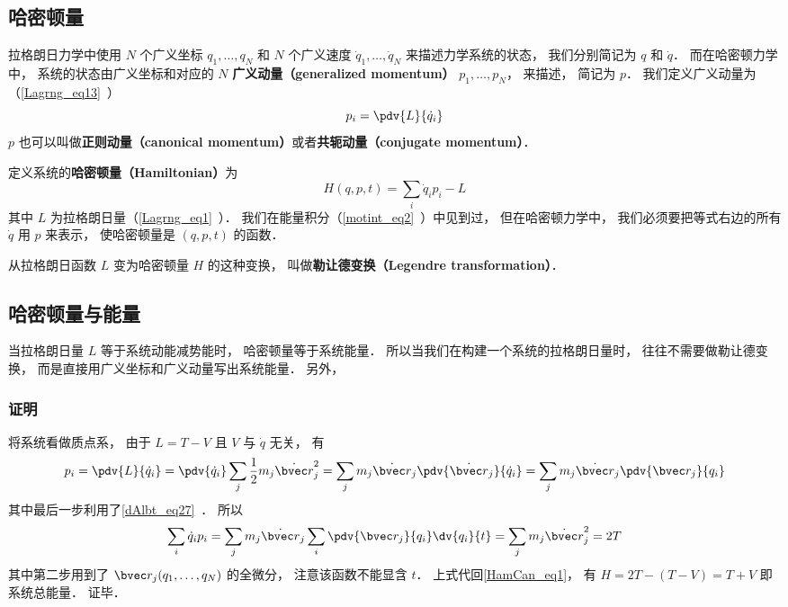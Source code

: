 

\subsection{哈密顿量}
拉格朗日力学中使用 $N$ 个广义坐标 $q_1,\dots,q_N$ 和 $N$ 个广义速度 $\dot q_1,\dots,\dot q_N$ 来描述力学系统的状态， 我们分别简记为 $q$ 和 $\dot q$． 而在哈密顿力学中， 系统的状态由广义坐标和对应的 $N$ \textbf{广义动量（generalized momentum）} $p_1, \dots, p_N$， 来描述， 简记为 $p$． 我们定义广义动量为（\autoref{Lagrng_eq13}~）
\begin{equation}
p_i = \pdv{L}{\dot q_i}
\end{equation}
$p$ 也可以叫做\textbf{正则动量（canonical momentum）}或者\textbf{共轭动量（conjugate momentum）}．

定义系统的\textbf{哈密顿量（Hamiltonian）}为
\begin{equation}\label{HamCan_eq1}
H(q,p,t) = \sum_i \dot q_i p_i - L
\end{equation}
其中 $L$ 为拉格朗日量（\autoref{Lagrng_eq1}~）． 我们在能量积分（\autoref{motint_eq2}~）中见到过， 但在哈密顿力学中， 我们必须要把等式右边的所有 $\dot q$ 用 $p$ 来表示， 使哈密顿量是 $(q,p,t)$ 的函数．

从拉格朗日函数 $L$ 变为哈密顿量 $H$ 的这种变换， 叫做\textbf{勒让德变换（Legendre transformation）}．

\subsection{哈密顿量与能量}
当拉格朗日量 $L$ 等于系统动能减势能时， 哈密顿量等于系统能量． 所以当我们在构建一个系统的拉格朗日量时， 往往不需要做勒让德变换， 而是直接用广义坐标和广义动量写出系统能量． 另外， 

\subsubsection{证明}
将系统看做质点系， 由于 $L = T - V$ 且 $V$ 与 $\dot q$ 无关， 有
\begin{equation}
p_i = \pdv{L}{\dot q_i} = \pdv{\dot q_i} \sum_j \frac12 m_j \dot{\bvec r}_j^2
= \sum_j m_j \dot{\bvec r}_j \pdv{\dot{\bvec r}_j}{\dot q_i}
= \sum_j m_j \dot{\bvec r}_j  \pdv{\bvec r_j}{q_i}
\end{equation}
其中最后一步利用了\autoref{dAlbt_eq27}~． 所以
\begin{equation}
 \sum_i \dot q_i p_i = \sum_j m_j \dot{\bvec r}_j \sum_i \pdv{\bvec r_j}{q_i}\dv{q_i}{t}
= \sum_j m_j \dot{\bvec r}_j^2 = 2T
\end{equation}
其中第二步用到了 $\bvec r_j(q_1,\dots,q_N)$ 的全微分， 注意该函数不能显含 $t$．%
上式代回\autoref{HamCan_eq1}， 有 $H = 2T - (T - V) = T + V$ 即系统总能量． 证毕．

